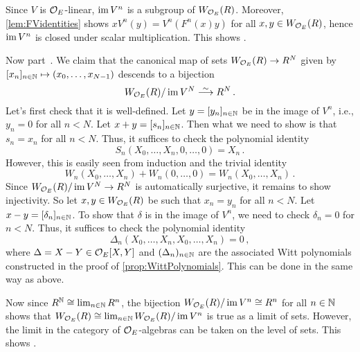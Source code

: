 \documentclass[a4paper, 10pt, oneside, DIV=9, chapterprefix=true, numbers=enddot,bibliography=totoc]{scrbook}
\begin{document}
\begin{proof*}
	Since $V$ is $\mathcal{O}_E$-linear, $\operatorname{im} V^n$ is a subgroup of $W_{\mathcal{O}_E}(R)$. Moreover, \cref{lem:FVidentities} shows $xV^n(y)=V^n(F^n(x)y)$ for all $x,y\in W_{\mathcal{O}_E}(R)$, hence $\operatorname{im} V^n$ is closed under scalar multiplication. This shows .
	
	Now part~. We claim that the canonical map of sets $W_{\Oo_E}(R)\morphism R^N$ given by $[x_n]_{n\in\mathbb{N}}\mapsto (x_0,\dotsc,x_{N-1})$ descends to a bijection
	\begin{equation*}
		W_{\Oo_E}(R)/\im V^N\isomorphism R^N\,.
	\end{equation*}
	Let's first check that it is well-defined. Let $y=[y_n]_{n\in \mathbb{N}}$ be in the image of $V^n$, i.e., $y_n=0$ for all $n< N$. Let $x+y=[s_n]_{n\in \mathbb{N}}$. Then what we need to show is that $s_n=x_n$ for all $n<N$. Thus, it suffices to check the polynomial identity
	\begin{equation*}
		S_n(X_0,\dotsc,X_n,0,\dotsc,0)=X_n\,.
	\end{equation*}
	However, this is easily seen from induction and the trivial identity
	\begin{equation*}
		W_n(X_0,\dotsc,X_n)+W_n(0,\dotsc,0)=W_n(X_0,\dotsc,X_n)\,.
	\end{equation*}
	Since $W_{\Oo_E}(R)/\im V^N\morphism R^N$ is automatically surjective, it remains to show injectivity. So let $x,y\in W_{\mathcal{O}_E}(R)$ be such that $x_n=y_n$ for all $n<N$. Let $x-y=[\delta_n]_{n\in\mathbb{N}}$. To show that $\delta$ is in the image of $V^n$, we need to check $\delta_n=0$ for $n<N$. Thus, it suffices to check the polynomial identity
	\begin{equation*}
		\Delta_n(X_0,\dotsc,X_n,X_0,\dotsc,X_n)=0\,,
	\end{equation*}
	where $\Delta=X-Y\in\mathcal{O}_E[X,Y]$ and $(\Delta_n)_{n\in\mathbb{N}}$ are the associated Witt polynomials constructed in the proof of \cref{prop:WittPolynomials}. This can be done in the same way as above.
	
	Now since $R^{\mathbb{N}}\cong \lim_{n\in\mathbb{N}}R^n$, the bijection $W_{\mathcal{O}_E}(R)/\operatorname{im} V^n\cong R^n$ for all $n\in \mathbb{N}$ shows that $W_{\mathcal{O}_E}(R)\cong \lim_{n\in\mathbb{N}}W_{\mathcal{O}_E}(R)/\operatorname{im} V^n$ is true as a limit of sets. However, the limit in the category of $\mathcal{O}_E$-algebras can be taken on the level of sets. This shows .
	

\end{proof*}
\end{document}
